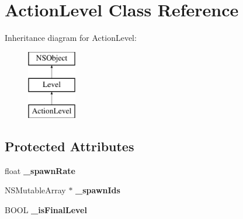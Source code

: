 \hypertarget{interface_action_level}{\section{Action\-Level Class Reference}
\label{interface_action_level}
}
Inheritance diagram for Action\-Level\-:\begin{figure}[H]
\begin{center}
\leavevmode
\includegraphics[height=3.000000cm]{interface_action_level}
\end{center}
\end{figure}
\subsection*{Protected Attributes}
\begin{DoxyCompactItemize}
\item 
\hypertarget{interface_action_level_a2928a72da3beceae840d740f5666ddf1}{float {\bfseries \-\_\-spawn\-Rate}}\label{interface_action_level_a2928a72da3beceae840d740f5666ddf1}

\item 
\hypertarget{interface_action_level_af88d6b873a7681e04b2b6b7c891a11d1}{N\-S\-Mutable\-Array $\ast$ {\bfseries \-\_\-spawn\-Ids}}\label{interface_action_level_af88d6b873a7681e04b2b6b7c891a11d1}

\item 
\hypertarget{interface_action_level_a00e3cf8898ca38a0239ff4d2ec36e58b}{B\-O\-O\-L {\bfseries \-\_\-is\-Final\-Level}}\label{interface_action_level_a00e3cf8898ca38a0239ff4d2ec36e58b}

\end{DoxyCompactItemize}
